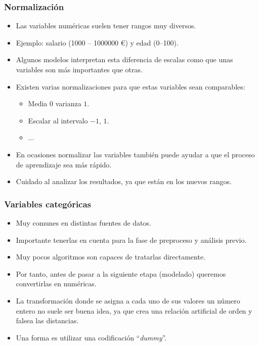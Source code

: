 \documentclass{beamer}
\begin{document}
\begin{frame}
\frametitle{Normalización}

\begin{itemize}
\item Las variables numéricas suelen tener rangos muy diversos.
\item Ejemplo: salario (1000 -- 1000000 \euro) y edad (0--100).
\item Algunos modelos interpretan esta diferencia de escalas como que unas variables son más importantes que otras.
\item Existen varias normalizaciones para que estas variables sean comparables:
\begin{itemize}
\item Media $0$ varianza $1$.
\item Escalar al intervalo $-1$, $1$.
\item ...
\end{itemize}
\item En ocasiones normalizar las variables también puede ayudar a que el proceso de aprendizaje sea más rápido.
\item Cuidado al analizar los resultados, ya que están en los nuevos rangos.
\end{itemize}
\end{frame}

\begin{frame}
\frametitle{Variables categóricas}

\begin{itemize}
\item Muy comunes en distintas fuentes de datos.
\item Importante tenerlas en cuenta para la fase de preproceso y análisis previo.
\item Muy pocos algoritmos son capaces de tratarlas directamente.
\item Por tanto, antes de pasar a la siguiente etapa (modelado) queremos convertirlas en numéricas.
\item La transformación donde se asigna a cada uno de sus valores un número entero no suele ser buena idea, ya que crea una relación artificial de orden y falsea las distancias.
\item Una forma es utilizar una codificación ``\textit{dummy}''.
\end{itemize}
\end{frame}
\end{document}
